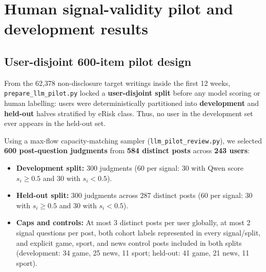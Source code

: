 \documentclass[11pt,a4paper]{article}
\begin{document}
\section{Human signal-validity pilot and development results}

\subsection{User-disjoint 600-item pilot design}
From the 62,378 non-disclosure target writings inside the first 12 weeks, \texttt{prepare\_llm\_pilot.py} locked a \textbf{user-disjoint split} before any model scoring or human labelling: users were deterministically partitioned into \textbf{development} and \textbf{held-out} halves stratified by eRisk class. Thus, no user in the development set ever appears in the held-out set.

Using a max-flow capacity-matching sampler (\texttt{llm\_pilot\_review.py}), we selected \textbf{600 post-question judgments} from \textbf{584 distinct posts} across \textbf{243 users}:
\begin{itemize}[nosep]
\item \textbf{Development split:} 300 judgments (60 per signal: 30 with Qwen score $s_i \ge 0.5$ and 30 with $s_i < 0.5$).
\item \textbf{Held-out split:} 300 judgments across 287 distinct posts (60 per signal: 30 with $s_i \ge 0.5$ and 30 with $s_i < 0.5$).
\item \textbf{Caps and controls:} At most 3 distinct posts per user globally, at most 2 signal questions per post, both cohort labels represented in every signal/split, and explicit game, sport, and news control posts included in both splits (development: 34 game, 25 news, 11 sport; held-out: 41 game, 21 news, 11 sport).
\end{itemize}
\end{document}
